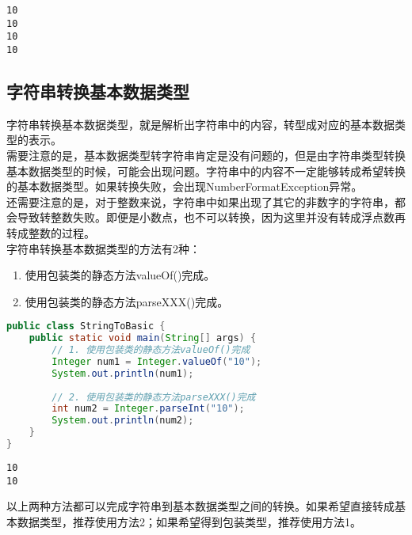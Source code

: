 \begin{tcolorbox}
	\begin{verbatim}
10
10
10
10
	\end{verbatim}
\end{tcolorbox}

\subsection{字符串转换基本数据类型}

字符串转换基本数据类型，就是解析出字符串中的内容，转型成对应的基本数据类型的表示。 \\

需要注意的是，基本数据类型转字符串肯定是没有问题的，但是由字符串类型转换基本数据类型的时候，可能会出现问题。字符串中的内容不一定能够转成希望转换的基本数据类型。如果转换失败，会出现NumberFormatException异常。 \\

还需要注意的是，对于整数来说，字符串中如果出现了其它的非数字的字符串，都会导致转整数失败。即便是小数点，也不可以转换，因为这里并没有转成浮点数再转成整数的过程。 \\

字符串转换基本数据类型的方法有2种：

\begin{enumerate}
	\item 使用包装类的静态方法valueOf()完成。
	\item 使用包装类的静态方法parseXXX()完成。
\end{enumerate}


\begin{lstlisting}[language=Java]
public class StringToBasic {
    public static void main(String[] args) {
        // 1. 使用包装类的静态方法valueOf()完成
        Integer num1 = Integer.valueOf("10");
        System.out.println(num1);
        
        // 2. 使用包装类的静态方法parseXXX()完成
        int num2 = Integer.parseInt("10");
        System.out.println(num2);
    }
}
\end{lstlisting}

\begin{tcolorbox}
	\begin{verbatim}
10
10
	\end{verbatim}
\end{tcolorbox}

以上两种方法都可以完成字符串到基本数据类型之间的转换。如果希望直接转成基本数据类型，推荐使用方法2；如果希望得到包装类型，推荐使用方法1。

